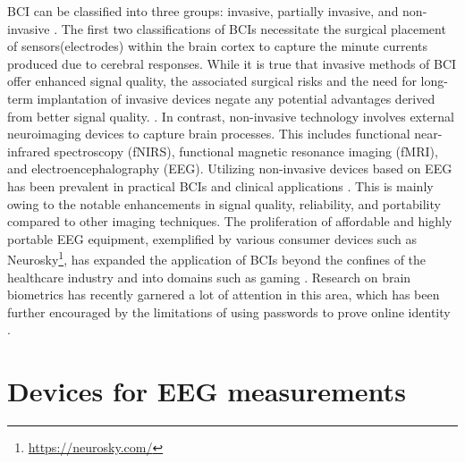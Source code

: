 BCI can be classified into three groups: invasive, partially invasive, and non-invasive \cite{girouard2009distinguishing}. The first two classifications of BCIs necessitate the surgical placement of sensors(electrodes) within the brain cortex to capture the minute currents produced due to cerebral responses. While it is true that invasive methods of BCI offer enhanced signal quality, the associated surgical risks and the need for long-term implantation of invasive devices negate any potential advantages derived from better signal quality. \cite{velasco2019bci}. 
In contrast, non-invasive technology involves external neuroimaging devices to capture brain processes. This includes functional near-infrared spectroscopy (fNIRS), functional magnetic resonance imaging (fMRI), and electroencephalography (EEG). Utilizing non-invasive devices based on EEG has been prevalent in practical BCIs and clinical applications \cite{BCI_applications}. This is mainly owing to the notable enhancements in signal quality, reliability, and portability compared to other imaging techniques. The proliferation of affordable and highly portable EEG equipment, exemplified by various consumer devices such as Neurosky\footnote{\url{https://neurosky.com/}}, has expanded the application of BCIs beyond the confines of the healthcare industry and into domains such as gaming \cite{van2012designing}. Research on brain biometrics has recently garnered a lot of attention in this area, which has been further encouraged by the limitations of using passwords to prove online identity \cite{arias2021inexpensive}.  


\section{Devices for EEG measurements}
\label{sec:Background:EEG Instruments and Data Acquisition}

